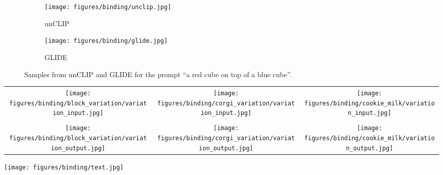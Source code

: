 \documentclass{article}
\newcommand{\modelname}{unCLIP}
\begin{document}
\begin{figure}[t]
    \begin{center}
    \begin{subfigure}{0.47\textwidth}
        \centering
        \texttt{[image: figures/binding/unclip.jpg]}
        \caption{\modelname{}}
    \end{subfigure}
    \begin{subfigure}{0.47\textwidth}
        \centering
        \texttt{[image: figures/binding/glide.jpg]}
        \caption{GLIDE}
    \end{subfigure}
    \end{center}
    \vskip -0.1in
    \caption{Samples from \modelname{} and GLIDE for the prompt ``a red cube on top of a blue cube''.}
    \label{fig:block_stacking}
    \vskip -0.1in
\end{figure}

\begin{figure*}[t]
    \centering
    \setlength{\tabcolsep}{10.0pt}
    \begin{tabular}{ccc}
        \texttt{[image: figures/binding/block\_variation/variation\_input.jpg]} &
        \texttt{[image: figures/binding/corgi\_variation/variation\_input.jpg]} &
        \texttt{[image: figures/binding/cookie\_milk/variation\_input.jpg]} \\
        \rule{0pt}{0.0pt} \\
        \texttt{[image: figures/binding/block\_variation/variation\_output.jpg]} & \texttt{[image: figures/binding/corgi\_variation/variation\_output.jpg]} & \texttt{[image: figures/binding/cookie\_milk/variation\_output.jpg]}

        \rule{0pt}{0.5pt}
    \end{tabular}

    \caption{Reconstructions from the decoder for difficult binding problems. We find that the reconstructions mix up objects and attributes. In the first two examples, the model mixes up the color of two objects. In the rightmost example, the model does not reliably reconstruct the relative size of two objects.}
    \label{fig:binding_variations}
    \vskip -0.1in 
\end{figure*}

\begin{figure*}[t]
    \centering
    \setlength{\tabcolsep}{10.0pt}
    \begin{center}
    \texttt{[image: figures/binding/text.jpg]}
    \end{center}

    \caption{Samples from \modelname{} for the prompt, ``A sign that says deep learning.''}
    \label{fig:ocr_samples}
\end{figure*}
\end{document}
